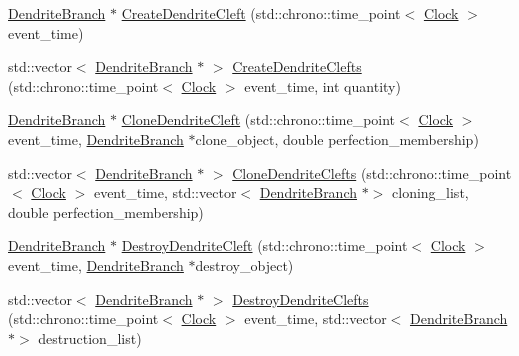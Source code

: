 \begin{DoxyCompactItemize}
\item 
\mbox{\hyperlink{classDendriteBranch}{Dendrite\+Branch}} $\ast$ \mbox{\hyperlink{classDendriteBranch_a4f751442a537f2e3d7d0dc66a09bd84b}{Create\+Dendrite\+Cleft}} (std\+::chrono\+::time\+\_\+point$<$ \mbox{\hyperlink{universe_8h_a0ef8d951d1ca5ab3cfaf7ab4c7a6fd80}{Clock}} $>$ event\+\_\+time)
\item 
std\+::vector$<$ \mbox{\hyperlink{classDendriteBranch}{Dendrite\+Branch}} $\ast$ $>$ \mbox{\hyperlink{classDendriteBranch_a86d00d6ad66c8c83683e9e22d73a71b6}{Create\+Dendrite\+Clefts}} (std\+::chrono\+::time\+\_\+point$<$ \mbox{\hyperlink{universe_8h_a0ef8d951d1ca5ab3cfaf7ab4c7a6fd80}{Clock}} $>$ event\+\_\+time, int quantity)
\item 
\mbox{\hyperlink{classDendriteBranch}{Dendrite\+Branch}} $\ast$ \mbox{\hyperlink{classDendriteBranch_a45d2fea350165fe0c81f1f429aa96061}{Clone\+Dendrite\+Cleft}} (std\+::chrono\+::time\+\_\+point$<$ \mbox{\hyperlink{universe_8h_a0ef8d951d1ca5ab3cfaf7ab4c7a6fd80}{Clock}} $>$ event\+\_\+time, \mbox{\hyperlink{classDendriteBranch}{Dendrite\+Branch}} $\ast$clone\+\_\+object, double perfection\+\_\+membership)
\item 
std\+::vector$<$ \mbox{\hyperlink{classDendriteBranch}{Dendrite\+Branch}} $\ast$ $>$ \mbox{\hyperlink{classDendriteBranch_a3cf1e07fe5e0ea827965c0dc76881c9f}{Clone\+Dendrite\+Clefts}} (std\+::chrono\+::time\+\_\+point$<$ \mbox{\hyperlink{universe_8h_a0ef8d951d1ca5ab3cfaf7ab4c7a6fd80}{Clock}} $>$ event\+\_\+time, std\+::vector$<$ \mbox{\hyperlink{classDendriteBranch}{Dendrite\+Branch}} $\ast$$>$ cloning\+\_\+list, double perfection\+\_\+membership)
\item 
\mbox{\hyperlink{classDendriteBranch}{Dendrite\+Branch}} $\ast$ \mbox{\hyperlink{classDendriteBranch_a60225ab106eae6bce25eb8159166d5e9}{Destroy\+Dendrite\+Cleft}} (std\+::chrono\+::time\+\_\+point$<$ \mbox{\hyperlink{universe_8h_a0ef8d951d1ca5ab3cfaf7ab4c7a6fd80}{Clock}} $>$ event\+\_\+time, \mbox{\hyperlink{classDendriteBranch}{Dendrite\+Branch}} $\ast$destroy\+\_\+object)
\item 
std\+::vector$<$ \mbox{\hyperlink{classDendriteBranch}{Dendrite\+Branch}} $\ast$ $>$ \mbox{\hyperlink{classDendriteBranch_a454dd0483439353076df63fc124a24f7}{Destroy\+Dendrite\+Clefts}} (std\+::chrono\+::time\+\_\+point$<$ \mbox{\hyperlink{universe_8h_a0ef8d951d1ca5ab3cfaf7ab4c7a6fd80}{Clock}} $>$ event\+\_\+time, std\+::vector$<$ \mbox{\hyperlink{classDendriteBranch}{Dendrite\+Branch}} $\ast$$>$ destruction\+\_\+list)
\item 

\end{DoxyCompactItemize}
